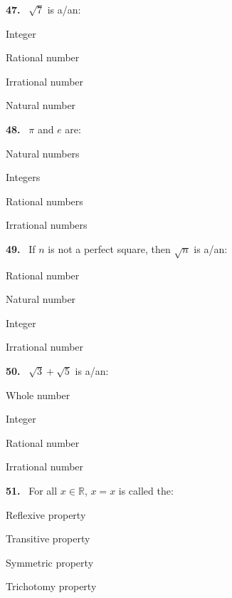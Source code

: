 \documentclass[11pt]{article}
\newenvironment{qenv}[1]{%
  \par\medskip\noindent\textbf{#1.}\ \ignorespaces
}{\par}
\begin{document}
\begin{qenv}{47} $\sqrt{7}$ is a/an:
\begin{options} \item Integer \item Rational number \item Irrational number \item Natural number \end{options} \end{qenv}

\begin{qenv}{48} $\pi$ and $e$ are:
\begin{options} \item Natural numbers \item Integers \item Rational numbers \item Irrational numbers \end{options} \end{qenv}

\begin{qenv}{49} If $n$ is not a perfect square, then $\sqrt{n}$ is a/an:
\begin{options} \item Rational number \item Natural number \item Integer \item Irrational number \end{options} \end{qenv}

\begin{qenv}{50} $\sqrt{3}+\sqrt{5}$ is a/an:
\begin{options} \item Whole number \item Integer \item Rational number \item Irrational number \end{options} \end{qenv}

\begin{qenv}{51} For all $x\in\mathbb{R}$, $x=x$ is called the:
\begin{options} \item Reflexive property \item Transitive property \item Symmetric property \item Trichotomy property \end{options} \end{qenv}
\end{document}
